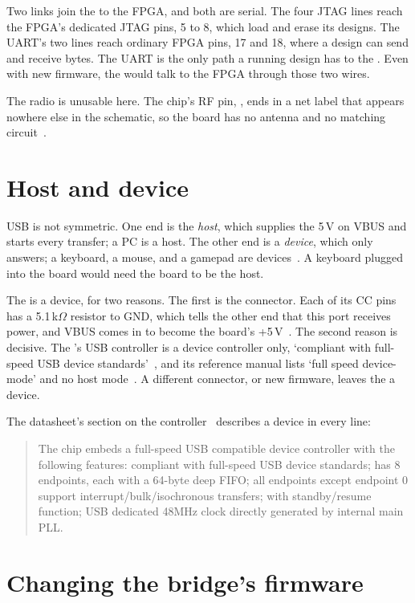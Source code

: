 \documentclass[11pt,a4paper]{article}
\newenvironment{datasheet}{\begin{quote}\small\sffamily}{\end{quote}}
\begin{document}
Two links join the  to the FPGA, and both are serial. The four JTAG lines reach the FPGA’s dedicated JTAG pins, 5 to 8, which load and erase its designs. The UART’s two lines reach ordinary FPGA pins, 17 and 18, where a design can send and receive bytes. The UART is the only path a running design has to the . Even with new firmware, the  would talk to the FPGA through those two wires.

The radio is unusable here. The chip’s RF pin, , ends in a net label that appears nowhere else in the schematic, so the board has no antenna and no matching circuit~\cite[p.~4]{schematic}.

\section*{Host and device}

USB is not symmetric. One end is the \emph{host}, which supplies the 5\,V on VBUS and starts every transfer; a PC is a host. The other end is a \emph{device}, which only answers; a keyboard, a mouse, and a gamepad are devices~\cite{nutshell}. A keyboard plugged into the board would need the board to be the host.

The  is a device, for two reasons. The first is the connector. Each of its CC pins has a 5.1\,k$\Omega$ resistor to GND, which tells the other end that this port receives power, and VBUS comes in to become the board’s +5\,V~\cite[p.~4]{schematic}. The second reason is decisive. The ’s USB controller is a device controller only, ‘compliant with full-speed USB device standards’~\cite[§2.10.9]{blds}, and its reference manual lists ‘full speed device-mode’ and no host mode~\cite[ch.~18]{blrm}. A different connector, or new firmware, leaves the  a device.

The datasheet’s section on the controller~\cite[§2.10.9]{blds} describes a device in every line:
\begin{datasheet}
The chip embeds a full-speed USB compatible device controller with the following features: compliant with full-speed USB device standards; has 8 endpoints, each with a 64-byte deep FIFO; all endpoints except endpoint 0 support interrupt/bulk/isochronous transfers; with standby/resume function; USB dedicated 48MHz clock directly generated by internal main PLL.
\end{datasheet}

\section*{Changing the bridge’s firmware}
\end{document}
